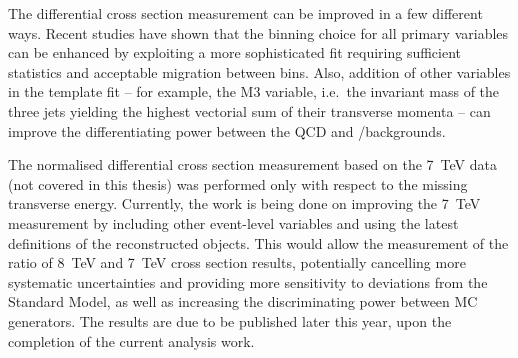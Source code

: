 The differential cross section measurement can be improved in a few different ways. Recent studies have shown that the
binning choice for all primary variables can be enhanced by exploiting a more sophisticated fit requiring sufficient
statistics and acceptable migration between bins. Also, addition of other variables in the template fit -- for example,
the M3 variable, i.e.\ the invariant mass of the three jets yielding the highest vectorial sum of their transverse
momenta -- can improve the differentiating power between the QCD and \W/\ZpJets backgrounds.

The normalised differential cross section measurement based on the \SI{7}{\TeV} data \autocite{xsection_PAS_7TeV} (not
covered in this thesis) was performed only with respect to the missing transverse energy. Currently, the work is being
done on improving the \SI{7}{\TeV} measurement by including other event-level variables and using the latest definitions
of the reconstructed objects. This would allow the measurement of the ratio of \SI{8}{\TeV} and \SI{7}{\TeV} cross
section results, potentially cancelling more systematic uncertainties and providing more sensitivity to deviations from
the Standard Model, as well as increasing the discriminating power between MC generators. The results are due to be
published later this year, upon the completion of the current analysis work.




